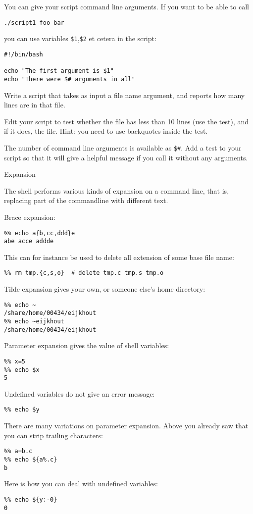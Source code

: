 You can give your script command line arguments. If you want to be
able to call
\begin{verbatim}
./script1 foo bar
\end{verbatim}
you can use variables \verb+$1+,\verb+$2+ et cetera in the script:
\begin{verbatim}
#!/bin/bash

echo "The first argument is $1"
echo "There were $# arguments in all"
\end{verbatim}

Write a script that takes as input a file name argument, and reports how many
lines are in that file.

Edit your script to test whether the file has less than 10 lines
(use the  test), and if it does,  the
file. Hint: you need to use backquotes inside the test.

The number of command line arguments is available as \verb+$#+. Add a
test to your script so that it will give a helpful message if you call
it without any arguments.

 {Expansion}
\label{tut:unix-expansion}

The shell performs various kinds of expansion on a command line, that
is, replacing part of the commandline with different text.

Brace expansion:
\begin{verbatim}
%% echo a{b,cc,ddd}e
abe acce addde
\end{verbatim}
This can for instance be used to delete all extension of some base
file name:
\begin{verbatim}
%% rm tmp.{c,s,o}  # delete tmp.c tmp.s tmp.o
\end{verbatim}

Tilde expansion gives your own, or someone else's home directory:
\begin{verbatim}
%% echo ~
/share/home/00434/eijkhout
%% echo ~eijkhout
/share/home/00434/eijkhout
\end{verbatim}

Parameter expansion gives the value of shell variables:
\begin{verbatim}
%% x=5
%% echo $x
5
\end{verbatim}
Undefined variables do not give an error message:
\begin{verbatim}
%% echo $y
\end{verbatim}
There are many variations on parameter expansion. Above you already
saw that you can strip trailing characters:
\begin{verbatim}
%% a=b.c
%% echo ${a%.c}
b
\end{verbatim}
Here is how you can deal with undefined variables:
\begin{verbatim}
%% echo ${y:-0}
0
\end{verbatim}

